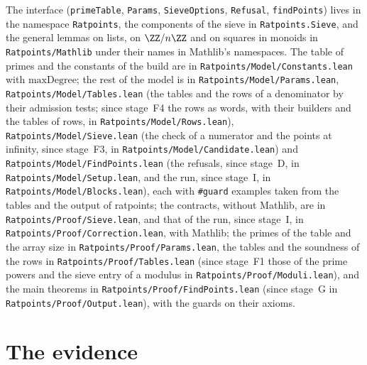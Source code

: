 The interface (\verb|primeTable|, \verb|Params|, \verb|SieveOptions|, \verb|Refusal|,
\verb|findPoints|) lives in the namespace \verb|Ratpoints|, the components of the
sieve in \verb|Ratpoints.Sieve|, and the general lemmas on lists, on $\ZZ/n\ZZ$ and on squares in
monoids in \verb|Ratpoints/Mathlib| under their names in Mathlib's namespaces. The table of primes
and the constants of the build are in \verb|Ratpoints/Model/Constants.lean| with
$\mathrm{maxDegree}$; the rest of the model is in \verb|Ratpoints/Model/Params.lean|,
\verb|Ratpoints/Model/Tables.lean| (the tables and the rows of a denominator by their admission
tests; since stage~F4 the rows as words, with their builders and the tables of rows, in
\verb|Ratpoints/Model/Rows.lean|), \verb|Ratpoints/Model/Sieve.lean| (the check of a numerator and
the points at infinity, since stage~F3, in \verb|Ratpoints/Model/Candidate.lean|) and
\verb|Ratpoints/Model/FindPoints.lean| (the refusals, since stage~D, in
\verb|Ratpoints/Model/Setup.lean|, and the run, since stage~I, in
\verb|Ratpoints/Model/Blocks.lean|), each with \verb|#guard| examples taken from the tables and the
output of ratpoints; the contracts, without Mathlib, are in \verb|Ratpoints/Proof/Sieve.lean|, and
that of the run, since stage~I, in \verb|Ratpoints/Proof/Correction.lean|, with Mathlib; the primes
of the table and the array size in \verb|Ratpoints/Proof/Params.lean|, the tables and the
soundness of the rows in \verb|Ratpoints/Proof/Tables.lean| (since stage~F1 those of the prime
powers and the sieve entry of a modulus in \verb|Ratpoints/Proof/Moduli.lean|), and the main
theorems in \verb|Ratpoints/Proof/FindPoints.lean| (since stage~G in
\verb|Ratpoints/Proof/Output.lean|), with the guards on their axioms.

\section{The evidence}\label{sec:sieve-evidence}

